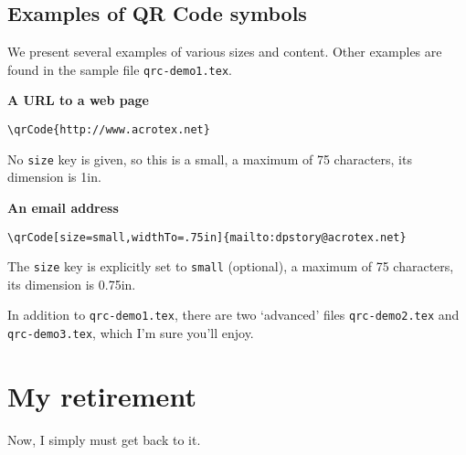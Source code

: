 \documentclass{article}
\begin{document}
\subsection{Examples of QR Code symbols} %

We present several examples of various sizes and content. Other examples are
found in the sample file \texttt{qrc-demo1.tex}.
\bVerb\def\sz{1in}%
\noindent\begin{minipage}[t]{\sz+2bp}\kern0pt
\end{minipage}\hfill\begin{minipage}[t]{\linewidth-\sz-6pt-2bp}\kern0pt
\textbf{A URL to a web page}
\begin{Verbatim}[commandchars=!()]
\qrCode{http://www.acrotex.net}
\end{Verbatim}
No \texttt{size} key is given, so this is a small, a maximum of 75 characters, its dimension
is 1in.
\end{minipage}\eVerb
\bVerb\def\sz{1in}%
\noindent\begin{minipage}[t]{\sz+2bp}\kern0pt\centering
{}
\end{minipage}\hfill\begin{minipage}[t]{\linewidth-\sz-6pt-2bp}\kern0pt
\textbf{An email address}
\begin{Verbatim}[commandchars=!(),fontsize=\small]
\qrCode[size=small,widthTo=.75in]{mailto:dpstory@acrotex.net}
\end{Verbatim}
\medskip
The \texttt{size} key is explicitly set to \texttt{small} (optional), a
maximum of 75 characters, its dimension is 0.75in.
\end{minipage}\eVerb\smallskip

In addition to \texttt{qrc-demo1.tex}, there are two `advanced' files \texttt{qrc-demo2.tex} and
\texttt{qrc-demo3.tex}, which I'm sure you'll enjoy.


\section{My retirement}


\newtopic
Now, I simply must get back to it. \dps
\end{document}
